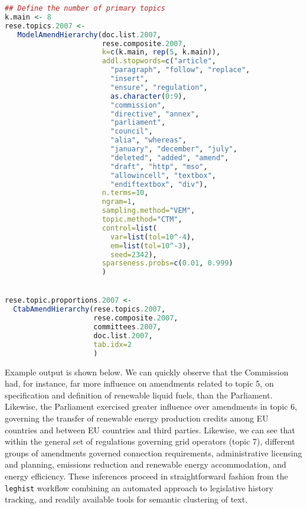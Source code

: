 \documentclass[11pt]{article}
\begin{document}
\begin{lstlisting}[language=R, numbers=none]
## Define the number of primary topics
k.main <- 8
rese.topics.2007 <- 
   ModelAmendHierarchy(doc.list.2007,
                       rese.composite.2007,
                       k=c(k.main, rep(5, k.main)),
                       addl.stopwords=c("article",
                         "paragraph", "follow", "replace",
                         "insert",
                         "ensure", "regulation",
                         as.character(0:9),
                         "commission",
                         "directive", "annex",
                         "parliament",
                         "council",
                         "alia", "whereas",
                         "january", "december", "july",
                         "deleted", "added", "amend",
                         "draft", "http", "mso",
                         "allowincell", "textbox",
                         "endiftextbox", "div"),
                       n.terms=10,
                       ngram=1,
                       sampling.method="VEM",
                       topic.method="CTM",
                       control=list(
                         var=list(tol=10^-4),
                         em=list(tol=10^-3),
                         seed=2342),
                       sparseness.probs=c(0.01, 0.999)
                       )


rese.topic.proportions.2007 <-
  CtabAmendHierarchy(rese.topics.2007,
                     rese.composite.2007,
                     committees.2007,
                     doc.list.2007,
                     tab.idx=2
                     )

\end{lstlisting}

Example output is shown below. We can quickly observe that the
Commission had, for instance, far more influence on amendments related
to topic 5, on specification and definition of renewable liquid fuels,
than the Parliament. Likewise, the Parliament exercised greater
influence over amendments in topic 6, governing the transfer of
renewable energy production credits among EU countries and between EU
countries and third parties. Likewise, we can see that within the
general set of regulations governing grid operators (topic 7),
different groups of amendments governed connection requirements,
administrative licensing and planning, emissions reduction and
renewable energy accommodation, and energy efficiency. These
inferences proceed in straightforward fashion from the
\texttt{leghist} workflow combining
an automated approach to legislative history tracking, and readily
available tools for semantic clustering of text. 
\end{document}
